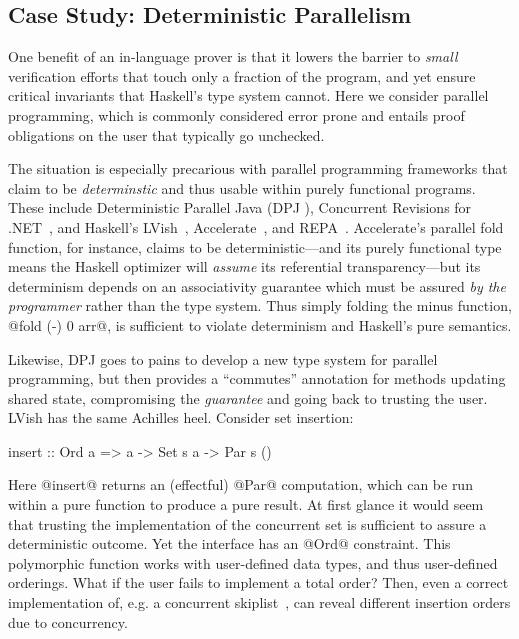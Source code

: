 \subsection{Case Study: Deterministic Parallelism}
\label{sec:detpar}


One benefit of an in-language prover is that it lowers the barrier to {\em
  small} verification efforts that touch only a fraction of the program, and yet
ensure critical invariants that Haskell's type system cannot.  Here we consider
parallel programming, which is commonly considered error prone and entails
proof obligations on the user that typically go unchecked.

The situation is especially precarious with parallel programming frameworks that
claim to be {\em determinstic} and thus usable within purely functional
programs.  These include Deterministic Parallel Java (DPJ \cite{DPJ}), Concurrent
Revisions for .NET~\cite{concurrent-revisions-oopsla}, and Haskell's
LVish~\cite{kuper2014freeze}, Accelerate~\cite{accelerate-icfp13}, and
REPA~\cite{repa-icfp10}.
%
Accelerate's parallel fold function, for instance, claims to be
deterministic---and its purely functional type means the Haskell optimizer will
{\em assume} its referential transparency---but its determinism depends on an
associativity guarantee which must be assured {\em by the programmer} rather than the
type system.
%
Thus simply folding the minus function, @fold (-) 0 arr@, is sufficient to
violate determinism and Haskell's pure semantics.


Likewise, DPJ goes to pains to develop a new type system for parallel
programming, but then provides a ``commutes'' annotation for methods updating
shared state, compromising the {\em guarantee} and going back to trusting the
user. LVish has the same Achilles heel. Consider set insertion:

\begin{code}
  insert :: Ord a => a -> Set s a -> Par s ()
\end{code}

Here @insert@ returns an (effectful) @Par@ computation, which can be run within a
pure function to produce a pure result.  At first glance it would seem that
trusting the implementation of the concurrent set is sufficient to assure a
deterministic outcome.  Yet the interface has an @Ord@ constraint. This
 polymorphic function works with user-defined data types, and thus
user-defined orderings.  What if the user fails to implement a total order?
Then, even a correct implementation of, e.g. a concurrent
skiplist~\cite{concurrent-skiplist}, can reveal
different insertion orders due to concurrency.

